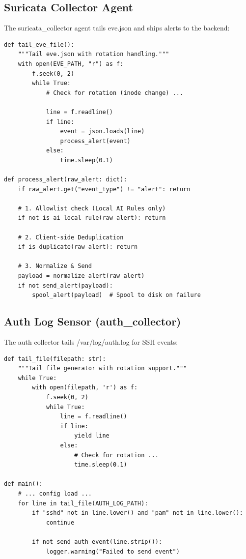 \documentclass[12pt,a4paper]{report} %
\begin{document}
\subsection{Suricata Collector Agent}
The suricata\_collector agent tails eve.json and ships alerts to the backend:

\begin{lstlisting}[style=python,caption=Suricata Collector Core Logic]
def tail_eve_file():
    """Tail eve.json with rotation handling."""
    with open(EVE_PATH, "r") as f:
        f.seek(0, 2)
        while True:
            # Check for rotation (inode change) ...
            
            line = f.readline()
            if line:
                event = json.loads(line)
                process_alert(event)
            else:
                time.sleep(0.1)

def process_alert(raw_alert: dict):
    if raw_alert.get("event_type") != "alert": return
    
    # 1. Allowlist check (Local AI Rules only)
    if not is_ai_local_rule(raw_alert): return

    # 2. Client-side Deduplication
    if is_duplicate(raw_alert): return

    # 3. Normalize & Send
    payload = normalize_alert(raw_alert)
    if not send_alert(payload):
        spool_alert(payload)  # Spool to disk on failure
\end{lstlisting}

\subsection{Auth Log Sensor (auth\_collector)}
The auth collector tails /var/log/auth.log for SSH events:

\begin{lstlisting}[style=python,caption=Auth Collector Core Logic]
def tail_file(filepath: str):
    """Tail file generator with rotation support."""
    while True:
        with open(filepath, 'r') as f:
            f.seek(0, 2)
            while True:
                line = f.readline()
                if line:
                    yield line
                else:
                    # Check for rotation ...
                    time.sleep(0.1)

def main():
    # ... config load ...
    for line in tail_file(AUTH_LOG_PATH):
        if "sshd" not in line.lower() and "pam" not in line.lower():
            continue
            
        if not send_auth_event(line.strip()):
            logger.warning("Failed to send event")
\end{lstlisting}
\end{document}
